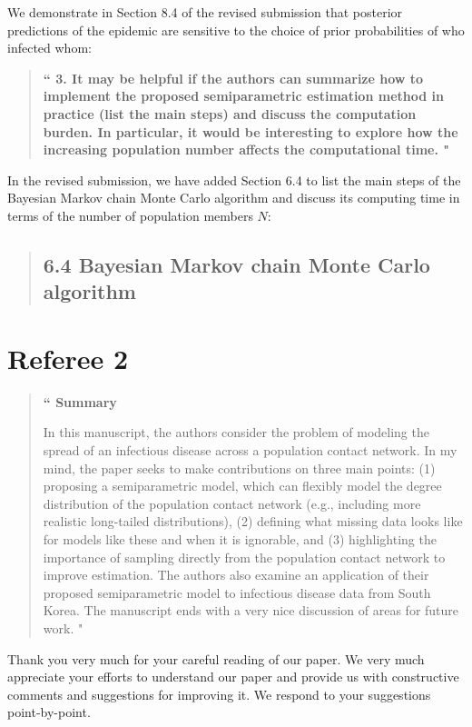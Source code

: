 \documentclass[12pt]{article}
\renewcommand{\=}{&=&}
\renewcommand{\bbq}{\vspace{.05cm}\begin{quote}\bf``}
\renewcommand{\ebq}{\hspace{-.15cm}"\end{quote}}
\newcommand{\bauthq}{\vspace{.05cm}\begin{quote}\em}
\newcommand{\eauthq}{\hspace{-.25cm}\end{quote}}
\renewcommand{\=}{&=&}
\begin{document}
We demonstrate in Section 8.4 of the revised submission that posterior predictions of the epidemic are sensitive to the choice of prior probabilities of who infected whom:
\bauthq\eauthq

\vspace{-.4cm}

\bbq
3. It may be helpful if the authors can summarize how to implement the proposed semiparametric estimation method in practice (list the main steps) and discuss the computation burden. In particular, it would be interesting to explore how the increasing population number affects the computational time.
\ebq

In the revised submission,
we have added Section 6.4 to list the main steps of the Bayesian Markov chain Monte Carlo algorithm and discuss its computing time in terms of the number of population members $N$:
\vspace{-.5cm}
\bauthq\subsection*{6.4 Bayesian Markov chain Monte Carlo algorithm}
\eauthq

\section*{Referee 2}

\bbq
Summary

In this manuscript, the authors consider the problem of modeling the spread of an infectious disease across a population contact network. In my mind, the paper seeks to make contributions on three main points: (1) proposing a semiparametric model, which can flexibly model the degree distribution of the population contact network (e.g., including more realistic long-tailed distributions), (2) defining what missing data looks like for models like these and when it is ignorable, and (3) highlighting the importance of sampling directly from the population contact network to improve estimation. The authors also examine an application of their proposed semiparametric model to infectious disease data from South Korea. The manuscript ends with a very nice discussion of areas for future work.
\ebq

Thank you very much for your careful reading of our paper.
We very much appreciate your efforts to understand our paper and provide us with constructive comments and suggestions for improving it.
We respond to your suggestions point-by-point.
\end{document}
